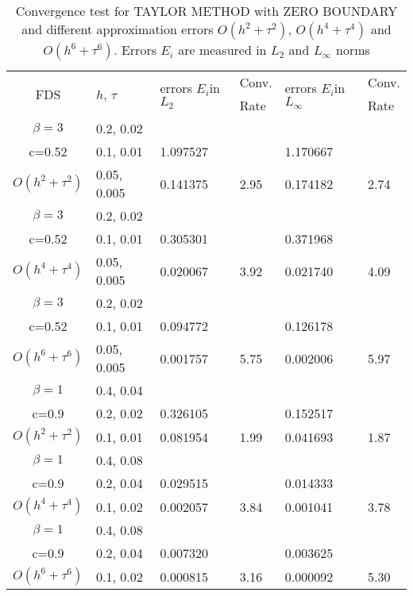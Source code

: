 \documentclass{article}
\begin{document}
\begin{table}[ht]
\centering
\small
		\begin{tabular}{||c|l|ll|ll||}
			\hline
			\hline
      \multirow{2  }{*}{FDS}        & \multirow{2  }{*}{$h$, $\tau$}  & \multirow{2  }{*}{errors $E_i$in$L_2$}  &Conv.& \multirow{2  }{*}{errors $E_i$in$L_\infty$}  &Conv.  \\
	         &                    &                               & Rate   &                                        & Rate \\
   			\hline 
					\hline 
  $\beta=3$                &0.2, 0.02          &              &              &                     &      \\
   c=0.52                     &0.1, 0.01          & 1.097527&            &1.170667    &       \\
     $O(h^2 + \tau^ 2)$ &0.05, 0.005   & 0.141375&2.95    &0.174182    &  2.74       \\
			\hline 
  $\beta=3$               &0.2, 0.02       &              &            &                     &      \\
   c=0.52                    &0.1, 0.01      &0.305301 &            &0.371968    &       \\
     $O(h^4+ \tau^4)$ &0.05, 0.005&0.020067 & 3.92   &0.021740     &4.09       \\
			\hline 
  $\beta=3$               &0.2, 0.02       &                &            &                     &      \\
     c=0.52                 &0.1, 0.01        &0.094772 &            &  0.126178    &       \\
     $O(h^6+ \tau^6)$ &0.05, 0.005 &0.001757 &5.75     & 0.002006     & 5.97       \\
	   \hline
			\hline 
       $\beta=1$       &0.4, 0.04        &             &            &           &   \\
                  c=0.9    &0.2, 0.02       &0.326105   &            &0.152517&   \\
  $O(h^2+ \tau^2)$ &0.1, 0.01   &0.081954  &1.99 &0.041693  & 1.87 \\
			\hline
      $\beta=1$               &0.4, 0.08    &            &               &             &    \\
       c=0.9                     &0.2, 0.04     & 0.029515   &        &  0.014333   &   \\
       $O(h^4+ \tau^4)$ &0.1, 0.02   &0.002057 & 3.84   & 0.001041  & 3.78  \\
    \hline
  $\beta=1$     &0.4, 0.08   &            &          &                  &      \\
      c=0.9                    &0.2, 0.04   &0.007320 &           & 0.003625      &       \\
     $O(h^6+ \tau^6)$ &0.1, 0.02 & 0.000815 &3.16 & 0.000092  & 5.30        \\
	   \hline
			\hline 
		\end{tabular}
		\caption{Convergence test for TAYLOR METHOD with ZERO BOUNDARY and different approximation errors $O(h^{2} + \tau^2 )$, $O(h^{4} + \tau^4 )$ and $O(h^{6} + \tau^6 )$. Errors $E_i$ are measured in $L_2$ and $L_\infty$ norms}
\label{tableA}
\end{table}
\end{document}
